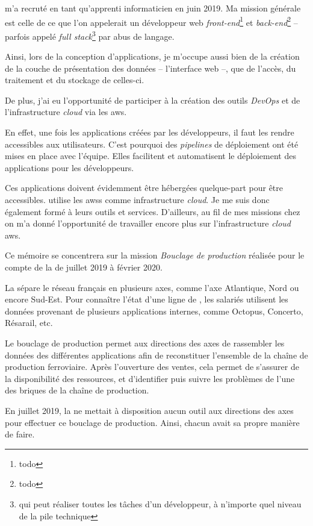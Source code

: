 \entreprise m'a recruté en tant qu'apprenti informaticien en juin 2019.
Ma mission générale est celle de ce que l'on appelerait un développeur web 
\textit{front-end}\footnote{todo}
et 
\textit{back-end}\footnote{todo} 
-- parfois appelé 
\textit{full stack}\footnote{qui peut réaliser toutes les tâches d'un développeur, à n'importe quel niveau de la \og pile technique \fg}
par abus de langage.

Ainsi, lors de la conception d'applications, je m'occupe aussi bien de la création de la couche de présentation des données -- l'interface web --, que de l'accès, du traitement et du stockage de celles-ci.

De plus, j'ai eu l'opportunité de participer à la création des outils \textit{DevOps} et de l'infrastructure \textit{cloud} via les \gls{aws}.

En effet, une fois les applications créées par les développeurs, il faut les rendre accessibles aux utilisateurs. C'est pourquoi des \textit{pipelines} de déploiement ont été mises en place avec l'équipe. Elles facilitent et automatisent le déploiement des applications pour les développeurs.

Ces applications doivent évidemment être hébergées quelque-part pour être accessibles. \entreprise utilise les \glspl{aws} comme infrastructure \textit{cloud}. Je me suis donc également formé à leurs outils et services. D'ailleurs, au fil de mes missions chez \entreprise on m'a donné l'opportunité de travailler encore plus sur l'infrastructure \textit{cloud} \gls{aws}.

\newpage{}

Ce mémoire se concentrera sur la mission \emph{Bouclage de production} réalisée pour le compte de la \sncf de juillet 2019 à février 2020.

La \sncf sépare le réseau \tgv français en plusieurs axes, comme l'axe Atlantique, Nord ou encore Sud-Est.
Pour connaître l'état d'une ligne de \tgv, les salariés utilisent les données provenant de plusieurs applications internes, comme Octopus, Concerto, Résarail, etc.

Le \og bouclage de production \fg permet aux directions des axes de rassembler les données des différentes applications afin de reconstituer l'ensemble de la chaîne de production ferroviaire.
Après l'ouverture des ventes, cela permet de s'assurer de la disponibilité des ressources, et d'identifier puis suivre les problèmes de l'une des briques de la chaîne de production.

En juillet 2019, la \sncf ne mettait à disposition aucun outil aux directions des axes pour effectuer ce bouclage de production. Ainsi, chacun avait sa propre manière de faire.

